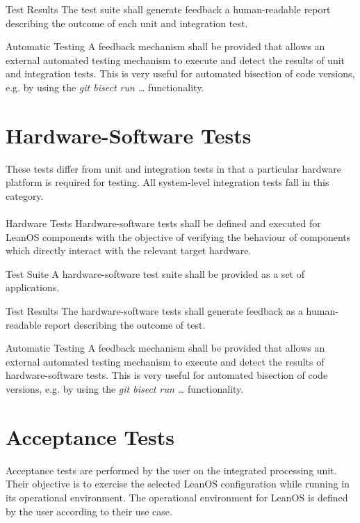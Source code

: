  {Test Results}{%
The test suite shall generate feedback a human-readable report describing the %
outcome of each unit and integration test.%
}{}

 {Automatic Testing}{%
A feedback mechanism shall be provided that allows an external automated %
testing mechanism to execute and detect the results of unit and integration %
tests.%
}{This is very useful for automated bisection of code versions, e.g. by %
using the \emph{git bisect run \ldots} functionality.}%


\section {Hardware-Software Tests}

These tests differ from unit and integration tests in that a particular hardware
platform is required for testing. All system-level integration tests fall in
this category.\\
\\

 {Hardware Tests}{%
Hardware-software tests shall be defined and executed for LeanOS components %
with the objective of verifying the behaviour of components which directly %
interact with the relevant target hardware.%
}{}

 {Test Suite}{%
A hardware-software test suite shall be provided as a set of applications.
}{}

 {Test Results}{%
The hardware-software tests shall generate feedback as a human-readable %
report describing the outcome of test.%
}{}


 {Automatic Testing}{%
A feedback mechanism shall be provided that allows an external automated %
testing mechanism to execute and detect the results of hardware-software tests.%
}{This is very useful for automated bisection of code versions, e.g. by %
using the \emph{git bisect run \ldots} functionality.}%


\section {Acceptance Tests}

Acceptance tests are performed by the user on the integrated processing unit.
Their objective is to exercise the selected LeanOS configuration while running
in its operational environment. The operational environment for LeanOS is
defined by the user according to their use case.\\



